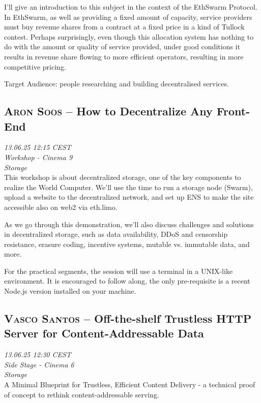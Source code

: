 I'll give an introduction to this subject in the context of the EthSwarm Protocol. In EthSwarm, as well as providing a fixed amount of capacity, service providers must buy revenue shares from a contract at a fixed price in a kind of Tullock contest. Perhaps surprisingly, even though this allocation system has nothing to do with the amount or quality of service provided, under good conditions it results in revenue share flowing to more efficient operators, resulting in more competitive pricing.

Target Audience: people researching and building decentralised services.

\clearpage
\subsection {\textsc{Aron Soos}  -- How to Decentralize Any Front-End} \noindent \textit {13.06.25 12:15 CEST\\ Workshop - Cinema 9\\ Storage}\\[1em] This workshop is about decentralized storage, one of the key components to realize the World Computer. We'll use the time to run a storage node (Swarm), upload a website to the decentralized network, and set up ENS to make the site accessible also on web2 via eth.limo.

As we go through this demonstration, we'll also discuss challenges and solutions in decentralized storage, such as data availability, DDoS and censorship resistance, erasure coding, incentive systems, mutable vs. immutable data, and more.

For the practical segments, the session will use a terminal in a UNIX-like environment. It is encouraged to follow along, the only pre-requisite is a recent Node.js version installed on your machine.

\clearpage
\subsection {\textsc{Vasco Santos}  -- Off-the-shelf Trustless HTTP Server for Content-Addressable Data} \noindent \textit {13.06.25 12:30 CEST\\ Side Stage - Cinema 6\\ Storage}\\[1em] A Minimal Blueprint for Trustless, Efficient Content Delivery - a technical proof of concept to rethink content-addressable serving.

\clearpage
